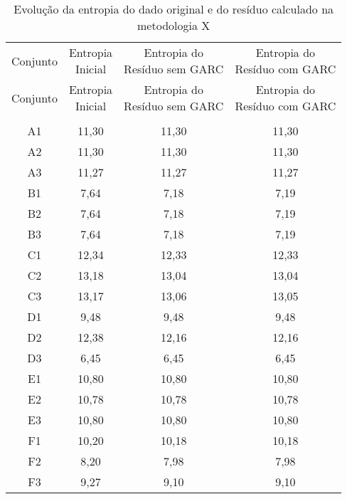 \begin{center}
\begin{longtable}{cccc}
\toprule
\rowcolor{white}
\caption[Metodologia X: evolução da entropia]{Evolução da entropia do dado
original e do resíduo calculado na metodologia X}
\label{tab:EvolucaoEntropiaMet10}\\
\midrule
Conjunto & \specialcell{Entropia \\Inicial} & \specialcell{Entropia do
\\Resíduo sem GARC} & \specialcell{Entropia do
\\Resíduo com GARC}  \\
\midrule
\endfirsthead
\midrule
\rowcolor{white}
Conjunto & \specialcell{Entropia \\Inicial} & \specialcell{Entropia do
\\Resíduo sem GARC} & \specialcell{Entropia do
\\Resíduo com GARC}  \\
\toprule
\endhead
\midrule \\ %
\endfoot
\bottomrule 
\endlastfoot
A1    & 11,30 & 11,30 & 11,30 \\
A2    & 11,30 & 11,30 & 11,30 \\
A3    & 11,27 & 11,27 & 11,27 \\
B1    & 7,64  & 7,18  & 7,19 \\
B2    & 7,64  & 7,18  & 7,19 \\
B3    & 7,64  & 7,18  & 7,19 \\
C1    & 12,34 & 12,33 & 12,33 \\
C2    & 13,18 & 13,04 & 13,04 \\
C3    & 13,17 & 13,06 & 13,05 \\
D1    & 9,48  & 9,48  & 9,48 \\
D2    & 12,38 & 12,16 & 12,16 \\
D3    & 6,45  & 6,45  & 6,45 \\
E1    & 10,80 & 10,80 & 10,80 \\
E2    & 10,78 & 10,78 & 10,78 \\
E3    & 10,80 & 10,80 & 10,80 \\
F1    & 10,20 & 10,18 & 10,18 \\
F2    & 8,20  & 7,98  & 7,98 \\
F3    & 9,27  & 9,10  & 9,10 \\

\end{longtable}
\end{center}
